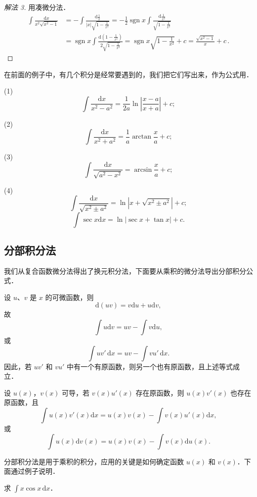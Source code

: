 \begin{proof}[解法 3]
用凑微分法．
\[
\begin{aligned}
\int\frac{\mathrm{d}x}{x^{2}\sqrt{x^{2}-1}}
&= -\int\frac{\mathrm{d}\frac{1}{x}}{|x|\sqrt{1-\frac{1}{x^{2}}}}
= -\frac{1}{2}\operatorname{sgn}x\int\frac{\mathrm{d}\frac{1}{x^{2}}}{\sqrt{1-\frac{1}{x^{2}}}}\\
&= \operatorname{sgn}x\int\frac{\mathrm{d}\left(1-\frac{1}{x^{2}}\right)}{2\sqrt{1-\frac{1}{x^{2}}}}
= \operatorname{sgn}x\sqrt{1-\frac{1}{x^{2}}}+c
= \frac{\sqrt{x^{2}-1}}{x}+c\,.
\end{aligned}
\]
\end{proof}

在前面的例子中，有几个积分是经常要遇到的，我们把它们写出来，作为公式用．

(1)
\[
\int\frac{\mathrm{d}x}{x^{2}-a^{2}} = \frac{1}{2a}\ln\left|\frac{x-a}{x+a}\right|+c;
\]

(2)
\[
\int\frac{\mathrm{d}x}{x^{2}+a^{2}} = \frac{1}{a}\arctan\frac{x}{a}+c;
\]

(3)
\[
\int\frac{\mathrm{d}x}{\sqrt{a^{2}-x^{2}}} = \arcsin\frac{x}{a}+c;
\]

(4)
\[
\int\frac{\mathrm{d}x}{\sqrt{x^{2}\pm a^{2}}} = \ln\left|x+\sqrt{x^{2}\pm a^{2}}\right|+c;
\]
\[
\int\sec x\mathrm{d}x = \ln|\sec x+\tan x|+c.
\]

\subsection{分部积分法}

我们从复合函数微分法得出了换元积分法，下面要从乘积的微分法导出分部积分公式．

设 $u$、$v$ 是 $x$ 的可微函数，则
\[
\mathrm{d}(uv) = v\mathrm{d}u + u\mathrm{d}v,
\]
故
\[
\int u\mathrm{d}v = uv - \int v\mathrm{d}u,
\]
或
\[
\int uv'\,\mathrm{d}x = uv - \int vu'\,\mathrm{d}x.
\]
因此，若 $uv'$ 和 $vu'$ 中有一个有原函数，则另一个也有原函数，且上述等式成立．

\begin{theorem}[分部积分公式]\label{thm:6-5}
设 $u(x)$，$v(x)$ 可导，若 $v(x)u'(x)$ 存在原函数，则 $u(x)v'(x)$ 也存在原函数，且
\[
\int u(x)v'(x)\mathrm{d}x = u(x)v(x)-\int v(x)u'(x)\mathrm{d}x,
\]
或
\[
\int u(x)\mathrm{d}v(x) = u(x)v(x)-\int v(x)\mathrm{d}u(x).
\]
\end{theorem}

分部积分法是用于乘积的积分，应用的关键是如何确定函数 $u(x)$ 和 $v(x)$．下面通过例子说明．

\begin{example}\label{ex:6-2-13}
求 $\displaystyle\int x\cos x\,\mathrm{d}x$．
\end{example}

